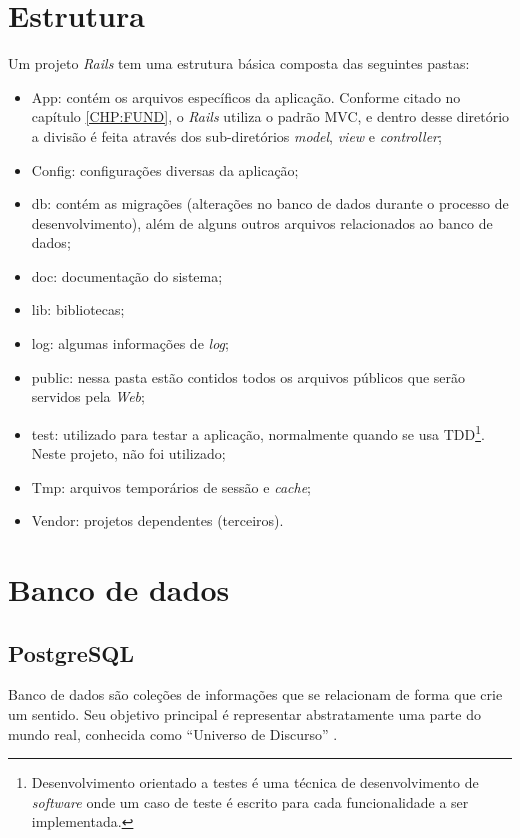    \section{Estrutura}
           
     
            Um projeto \emph{Rails} tem uma estrutura básica composta das seguintes pastas:
\begin{itemize}
\item App: contém os arquivos específicos da aplicação. Conforme citado no capítulo \ref{CHP:FUND}, o \emph{Rails} utiliza o padrão \ac{MVC}, e dentro desse diretório a divisão é feita através dos sub-diretórios \emph{model}, \emph{view} e \emph{controller};
\item Config: configurações diversas da aplicação;
\item db: contém as migrações (alterações no banco de dados durante o processo de desenvolvimento), além de alguns outros arquivos relacionados ao banco de dados;
\item doc: documentação do sistema;
\item lib: bibliotecas;
\item log: algumas informações de \emph{log};
\item public: nessa pasta estão contidos todos os arquivos públicos que serão servidos pela \emph{Web};
\item test: utilizado para testar a aplicação, normalmente quando se usa \ac{TDD}\footnote{Desenvolvimento orientado a testes é uma técnica de desenvolvimento de \emph{software} onde um caso de teste é escrito para cada funcionalidade a ser implementada.}. Neste projeto, não foi utilizado;
\item Tmp: arquivos temporários de sessão e \emph{cache};
\item Vendor: projetos dependentes (terceiros).
\end{itemize}     
     
    \section{Banco de dados}
    \subsection{PostgreSQL}
            Banco de dados são coleções de informações que se relacionam de forma que crie um sentido. Seu objetivo principal é representar abstratamente uma parte do mundo real, conhecida como ``Universo de Discurso'' \cite{ufmsbd}. 
			
